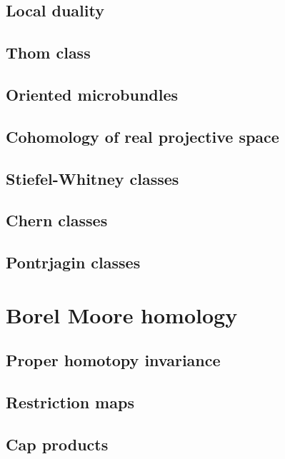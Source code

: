 \documentclass[5pt]{article}
\theoremstyle{definition}
\theoremstyle{remark}
\begin{document}
	\subsection{Local duality}
	
	\subsection{Thom class}
	
	\subsection{Oriented microbundles}
	
	\subsection{Cohomology of real projective space}
	
	\subsection{Stiefel-Whitney classes}
	
	\subsection{Chern classes}
	
	\subsection{Pontrjagin classes}
	
	\newpage	
	
	\section{Borel Moore homology}
	
	\subsection{Proper homotopy invariance}
	
	\subsection{Restriction maps}
	
	\subsection{Cap products}
	
\end{document}
